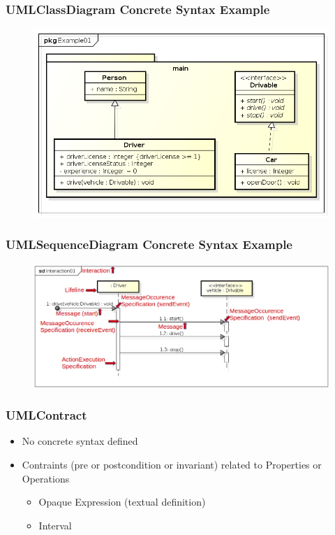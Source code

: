 \documentclass{beamer}
\begin{document}
\begin{frame}
	\frametitle{UMLClassDiagram Concrete Syntax Example}
	\nocite{omg2007unified}
	\begin{figure}[H]
		\includegraphics[width=.8\textwidth]{umlClassDiagramExample01_Diagram}
	\end{figure}
\end{frame}

\begin{frame}[t]
	\frametitle{UMLSequenceDiagram Concrete Syntax Example}
	\begin{figure}[H]
   		\includegraphics[width=\textwidth]{umlSequenceDiagramExample01_Diagram}
	\end{figure}
\end{frame}

\begin{frame}
	\frametitle{UMLContract}
	\begin{itemize}
		\item No concrete syntax defined
		\item Contraints (pre or postcondition or invariant) related to Properties or Operations
		\begin{itemize}
			\item Opaque Expression (textual definition)
			\item Interval
		\end{itemize}	
	\end{itemize}
\end{frame}
\end{document}
